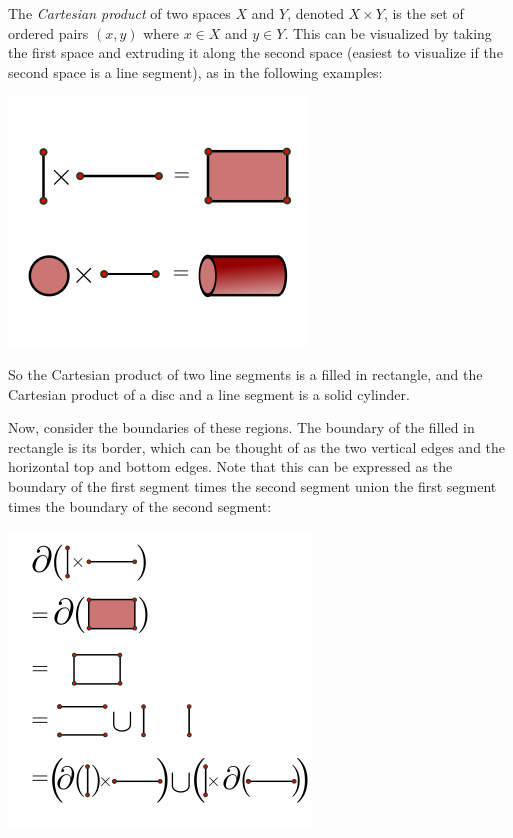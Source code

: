 \documentclass[twoside,openright,titlepage,a4paper]{book}
\begin{document}
\begin{sloppypar}
The \textit{Cartesian product} of two spaces $X$ and $Y$, denoted $X \times Y$, is the set of ordered pairs $(x,y)$ where $x \in X$ and $y \in Y$. This can be visualized by taking the first space and extruding it along the second space (easiest to visualize if the second space is a line segment), as in the following examples:
\begin{center}\includegraphics[scale=0.6]{CartesianProduct}\end{center}

So the Cartesian product of two line segments is a filled in rectangle, and the Cartesian product of a disc and a line segment is a solid cylinder.

Now, consider the boundaries of these regions. The boundary of the filled in rectangle is its border, which can be thought of as the two vertical edges and the horizontal top and bottom edges. Note that this can be expressed as the boundary of the first segment times the second segment union the first segment times the boundary of the second segment:
\begin{center}\includegraphics[scale=0.6]{BoundaryProduct}\end{center}


\end{sloppypar}
\end{document}

